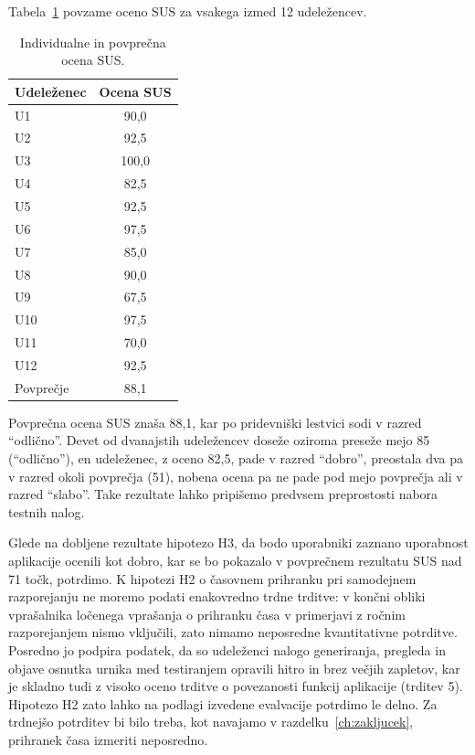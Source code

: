 Tabela~\ref{tab:sus-rezultati} povzame oceno SUS za vsakega izmed 12 udeležencev.

\begin{table}[htbp]
\centering
\caption{Individualne in povprečna ocena SUS.}
\label{tab:sus-rezultati}
\begin{tabular}{lc}
\toprule
Udeleženec & Ocena SUS \\
\midrule
U1  & 90,0 \\
U2  & 92,5 \\
U3  & 100,0 \\
U4  & 82,5 \\
U5  & 92,5 \\
U6  & 97,5 \\
U7  & 85,0 \\
U8  & 90,0 \\
U9  & 67,5 \\
U10 & 97,5 \\
U11 & 70,0 \\
U12 & 92,5 \\
\midrule
Povprečje & 88,1 \\
\bottomrule
\end{tabular}
\end{table}
\FloatBarrier

Povprečna ocena SUS znaša 88,1, kar po pridevniški lestvici sodi v razred ``odlično''. Devet od dvanajstih udeležencev doseže oziroma preseže mejo 85 (``odlično''), en udeleženec, z oceno 82,5, pade v razred ``dobro'', preostala dva pa v razred okoli povprečja (51), nobena ocena pa ne pade pod mejo povprečja ali v razred ``slabo''. Take rezultate lahko pripišemo predvsem preprostosti nabora testnih nalog.

Glede na dobljene rezultate hipotezo H3, da bodo uporabniki zaznano uporabnost aplikacije ocenili kot dobro, kar se bo pokazalo v povprečnem rezultatu SUS nad 71 točk, potrdimo. K hipotezi H2 o časovnem prihranku pri samodejnem razporejanju ne moremo podati enakovredno trdne trditve: v končni obliki vprašalnika ločenega vprašanja o prihranku časa v primerjavi z ročnim razporejanjem nismo vključili, zato nimamo neposredne kvantitativne potrditve. Posredno jo podpira podatek, da so udeleženci nalogo generiranja, pregleda in objave osnutka urnika med testiranjem opravili hitro in brez večjih zapletov, kar je skladno tudi z visoko oceno trditve o povezanosti funkcij aplikacije (trditev 5). Hipotezo H2 zato lahko na podlagi izvedene evalvacije potrdimo le delno. Za trdnejšo potrditev bi bilo treba, kot navajamo v razdelku~\ref{ch:zakljucek}, prihranek časa izmeriti neposredno.
